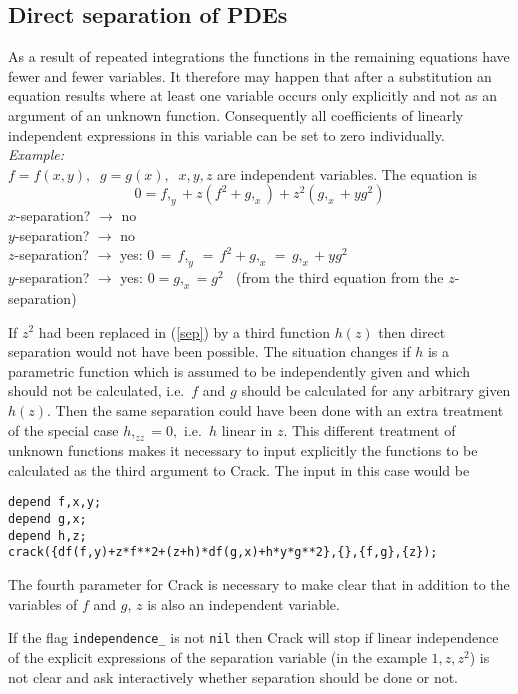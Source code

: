 \documentclass[12pt]{article}
\begin{document}
\subsection{Direct separation of PDEs}
As a result of repeated integrations the functions in the 
remaining equations have fewer and fewer variables. It therefore may happen
that after a substitution an equation results where at least one variable
occurs only explicitly and not as an argument of an unknown function.
Consequently all coefficients of linearly independent expressions in this
variable can be set to zero individually. \\
{\em Example:}  \\
$f = f(x,y), \;\; g = g(x), \;\; x,y,z$ are independent variables. 
The equation is
\begin{equation} 
0 = f,_y + z(f^2+g,_x) + z^2(g,_x+yg^2) \label{sep}
\end{equation}
$x$-separation? $\rightarrow$ no  \\
$y$-separation? $\rightarrow$ no  \\
$z$-separation? $\rightarrow$ yes: $0 \,=\, f,_y \,=\, f^2+g,_x \,=\,
g,_x+yg^2$ \\
$y$-separation? $\rightarrow$ yes: $0 = g,_x = g^2\;\;$ 
(from the third equation from the $z$-separation)   

If $z^2$ had been replaced in (\ref{sep}) by a third
function $h(z)$ then direct separation would not have been possible.
The situation changes if $h$ is a parametric function which is
assumed to be independently given and which should not be
calculated, i.e.\ $f$ and $g$ should be calculated for any
arbitrary given $h(z)$. Then the same separation could have been
done with an extra treatment of the special case $h,_{zz} = 0,$
i.e.\ $h$ linear in $z$. This different treatment of unknown functions
makes it necessary to input explicitly the functions to be
calculated as the third argument to {\sc Crack}. The input
in this case would be
\begin{verbatim}
depend f,x,y;
depend g,x;
depend h,z;
crack({df(f,y)+z*f**2+(z+h)*df(g,x)+h*y*g**2},{},{f,g},{z});
\end{verbatim}
The fourth parameter for {\sc Crack} is necessary to make clear that
in addition to the variables of $f$ and $g$, $z$ is also an independent
variable.
 
If the flag {\tt independence\_} is not {\tt nil} then {\sc Crack} will
stop if linear independence of the explicit expressions of the
separation variable (in the example $1,z,z^2$) is not clear and ask 
interactively whether separation should be done or not.
\end{document}
